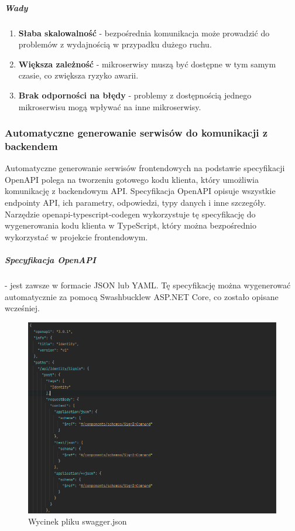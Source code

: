 \subparagraph{Wady}

\begin{enumerate}
\item {\bf Słaba skalowalność} - bezpośrednia komunikacja może prowadzić do problemów z wydajnością w przypadku dużego ruchu.
\item {\bf Większa zależność} - mikroserwisy muszą być dostępne w tym samym czasie, co zwiększa ryzyko awarii.
\item {\bf Brak odporności na błędy} - problemy z dostępnością jednego mikroserwisu mogą wpływać na inne mikroserwisy.

\end{enumerate}

\subsubsection{Automatyczne generowanie serwisów do komunikacji z backendem}
Automatyczne generowanie serwisów frontendowych na podstawie specyfikacji OpenAPI polega na tworzeniu gotowego kodu klienta, który umożliwia komunikację z backendowym API. Specyfikacja OpenAPI opisuje wszystkie endpointy API, ich parametry, odpowiedzi, typy danych i inne szczegóły. Narzędzie openapi-typescript-codegen wykorzystuje tę specyfikację do wygenerowania kodu klienta w TypeScript, który można bezpośrednio wykorzystać w projekcie frontendowym.

\subparagraph{Specyfikacja OpenAPI} - jest zawsze w formacie JSON lub YAML. Tę specyfikację można wygenerować automatycznie za pomocą Swashbuckle\linebreak w ASP.NET Core, co zostało opisane wcześniej.

\begin{figure}
    \centering
    \includegraphics[width=1\linewidth]{Obrazy/swaggerExample.png}
    \caption{Wycinek pliku swagger.json}
    \label{fig:enter-label}
\end{figure}

